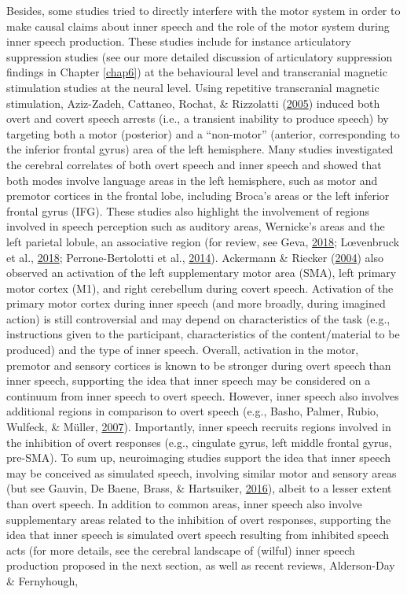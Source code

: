 \documentclass[a4paper,12pt,twoside,onecolumn,openright,final,oldfontcommands]{memoir}
\begin{document}
Besides, some studies tried to directly interfere with the motor system in order to make causal claims about inner speech and the role of the motor system during inner speech production. These studies include for instance articulatory suppression studies (see our more detailed discussion of articulatory suppression findings in Chapter \ref{chap6}) at the behavioural level and transcranial magnetic stimulation studies at the neural level. Using repetitive transcranial magnetic stimulation, Aziz-Zadeh, Cattaneo, Rochat, \& Rizzolatti (\protect\hyperlink{ref-Aziz-Zadeh2005}{2005}) induced both overt and covert speech arrests (i.e., a transient inability to produce speech) by targeting both a motor (posterior) and a \enquote{non-motor} (anterior, corresponding to the inferior frontal gyrus) area of the left hemisphere. Many studies investigated the cerebral correlates of both overt speech and inner speech and showed that both modes involve language areas in the left hemisphere, such as motor and premotor cortices in the frontal lobe, including Broca's areas or the left inferior frontal gyrus (IFG). These studies also highlight the involvement of regions involved in speech perception such as auditory areas, Wernicke's areas and the left parietal lobule, an associative region (for review, see Geva, \protect\hyperlink{ref-geva_inner_2018}{2018}; Lœvenbruck et al., \protect\hyperlink{ref-loevenbruck_cognitive_2018}{2018}; Perrone-Bertolotti et al., \protect\hyperlink{ref-Perrone-Bertolotti2014}{2014}). Ackermann \& Riecker (\protect\hyperlink{ref-ackermann_contribution_2004}{2004}) also observed an activation of the left supplementary motor area (SMA), left primary motor cortex (M1), and right cerebellum during covert speech. Activation of the primary motor cortex during inner speech (and more broadly, during imagined action) is still controversial and may depend on characteristics of the task (e.g., instructions given to the participant, characteristics of the content/material to be produced) and the type of inner speech. Overall, activation in the motor, premotor and sensory cortices is known to be stronger during overt speech than inner speech, supporting the idea that inner speech may be considered on a continuum from inner speech to overt speech. However, inner speech also involves additional regions in comparison to overt speech (e.g., Basho, Palmer, Rubio, Wulfeck, \& Müller, \protect\hyperlink{ref-basho_effects_2007}{2007}). Importantly, inner speech recruits regions involved in the inhibition of overt responses (e.g., cingulate gyrus, left middle frontal gyrus, pre-SMA). To sum up, neuroimaging studies support the idea that inner speech may be conceived as simulated speech, involving similar motor and sensory areas (but see Gauvin, De Baene, Brass, \& Hartsuiker, \protect\hyperlink{ref-gauvin_conflict_2016}{2016}), albeit to a lesser extent than overt speech. In addition to common areas, inner speech also involve supplementary areas related to the inhibition of overt responses, supporting the idea that inner speech is simulated overt speech resulting from inhibited speech acts (for more details, see the cerebral landscape of (wilful) inner speech production proposed in the next section, as well as recent reviews, Alderson-Day \& Fernyhough, 
\end{document}
